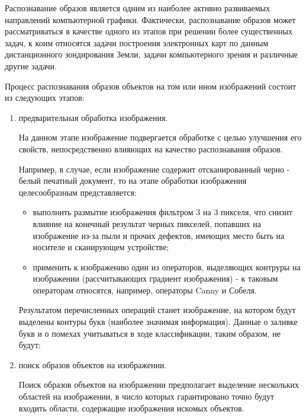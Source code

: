 

Распознавание образов является одним из наиболее активно развиваемых направлений компьютерной графики. Фактически, распознавание образов может рассматриваться в качестве одного из этапов при решении более существенных задач, к коим относятся задачи построения электронных карт по данным дистанционного зондирования Земли, задачи компьютерного зрения и различные другие задачи.

Процесс распознавания образов объектов на том или ином изображений состоит из следующих этапов:

\begin{enumerate}

	\item предварительная обработка изображения.

	На данном этапе изображение подвергается обработке с целью улучшения его свойств, непосредственно влияющих на качество распознавания образов.

	Например, в случае, если изображение содержит отсканированный черно - белый печатный документ, то на этапе обработки изображения целесообразным представляется:

	\begin{itemize}

		\item выполнить размытие изображения фильтром 3 на 3 пикселя, что снизит влияние на конечный результат черных пикселей, попавших на изображение из-за пыли и прочих дефектов, имеющих место быть на носителе и сканирующем устройстве;
		\item применить к изображению один из операторов, выделяющих контруры на изображении (рассчитывающих градиент изображения) - к таковым операторам относятся, например, операторы Canny и Собеля.

	\end{itemize}

	Результатом перечисленных операций станет изображение, на котором будут выделены контуры букв (наиболее значимая информация). Данные о заливке букв и о помехах учитываться в ходе классификации, таким образом, не будут;

	\item поиск образов объектов на изображении.
	
	Поиск образов объектов на изображении предполагает выделение нескольких областей на изображении, в число которых гарантировано точно будут входить области, содержащие изображения искомых объектов.


\end{enumerate}
